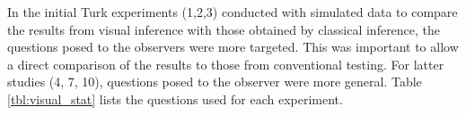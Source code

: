 \documentclass[10pt]{article}\usepackage[]{graphicx}\usepackage[]{color}
\begin{document}
\begin{itemize}
In the initial Turk experiments (1,2,3) conducted with simulated data to compare the results from visual inference with those obtained by classical inference, the questions posed to the observers were more targeted. This was important to allow a direct comparison of the results to those from conventional testing. %
For latter studies (4, 7, 10), questions posed to the observer were more general. Table \ref{tbl:visual_stat} lists the questions used for each experiment. 







\end{itemize}
\end{document}
